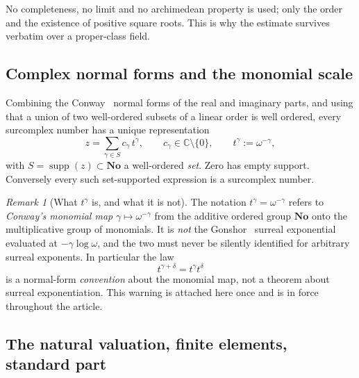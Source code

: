 \documentclass[11pt,a4paper]{article}
\numberwithin{equation}{section}
\theoremstyle{definition}
\theoremstyle{remark}
\newtheorem{remark}[theorem]{Remark}
\theoremstyle{plain}
\newcommand{\No}{\mathbf{No}}
\newcommand{\CC}{\mathbb C}
\DeclareMathOperator{\supp}{supp}
\newcommand{\tm}{t}
\begin{document}
No completeness, no limit and no archimedean property is used; only the
order and the existence of positive square roots.  This is why the
estimate survives verbatim over a proper-class field.

\subsection{Complex normal forms and the monomial scale}\label{a:sec:normal}

Combining the Conway~\cite{Conway} normal forms of the real and imaginary parts, and
using that a union of two well-ordered subsets of a linear order is well
ordered, every surcomplex number has a unique representation
\begin{equation}\label{a:eq:normal}
 z=\sum_{\gamma\in S}c_\gamma\,\tm^{\gamma},
 \qquad c_\gamma\in\CC\setminus\{0\},
 \qquad \tm^{\gamma}:=\omega^{-\gamma},
\end{equation}
with $S=\supp(z)\subset\No$ a well-ordered \emph{set}.  Zero has empty
support.  Conversely every such set-supported expression is a surcomplex
number.

\begin{remark}[What $\tm^{\gamma}$ is, and what it is not]\label{a:rem:monomial}
The notation $\tm^{\gamma}=\omega^{-\gamma}$ refers to \emph{Conway's
monomial map} $\gamma\mapsto\omega^{-\gamma}$ from the additive ordered
group $\No$ onto the multiplicative group of monomials.  It is
\emph{not} the Gonshor~\cite{Gonshor} surreal exponential evaluated at
$-\gamma\log\omega$, and the two must never be silently identified for
arbitrary surreal exponents.  In particular the law
\[
 \tm^{\gamma+\delta}=\tm^{\gamma}\tm^{\delta}
\]
is a normal-form \emph{convention} about the monomial map, not a theorem
about surreal exponentiation.  This warning is attached here once and is
in force throughout the article.
\end{remark}

\subsection{The natural valuation, finite elements, standard part}\label{a:sec:valuation}
\end{document}
